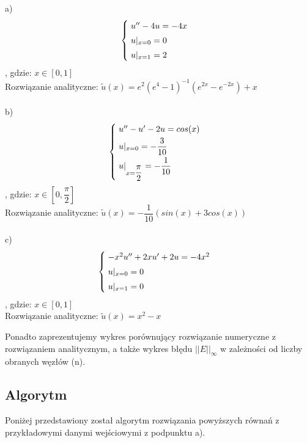 a)
\[
\begin{cases}
\vspace{0.1cm} 
\hspace{0,1cm} u'' - 4u =-4x \\
\vspace{0.1cm}
\hspace{0,1cm}u|_{x=0} = 0 \\
\hspace{0,1cm}u|_{x=1} = 2
\end{cases}
\]
, gdzie:
$x\in[0,1]$
\\
Rozwiązanie analityczne: $\widetilde{u}(x) = e^2(e^4-1)^{-1} (e^{2x} - e^{-2x}) + x$
\\
\\
b)
\[
\begin{cases}
\vspace{0.1cm} 
\hspace{0,1cm} u'' -u'- 2u =cos(x) \\
\vspace{0.1cm}
\hspace{0,1cm}u|_{x=0} = -\dfrac{3}{10} \\
\hspace{0,1cm}u|_{x=\dfrac{\pi}{2}} = -\dfrac{1}{10}
\end{cases}
\]
, gdzie:
$x\in[0, \dfrac{\pi}{2}]$
\\
Rozwiązanie analityczne: $\widetilde{u}(x) = -\dfrac{1}{10}(sin(x) + 3cos(x))$
\\
\\
c)
\[
\begin{cases}
\vspace{0.1cm} 
\hspace{0,1cm} -x^2u'' +2xu' +2u=-4x^2 \\
\vspace{0.1cm}
\hspace{0,1cm}u|_{x=0} = 0 \\
\hspace{0,1cm}u|_{x=1} = 0
\end{cases}
\]
, gdzie:
$x\in[0,1]$
\\
Rozwiązanie analityczne: $\widetilde{u}(x) = x^2 - x$

\vspace{0.3cm}
Ponadto zaprezentujemy wykres porównujący rozwiązanie numeryczne z rozwiązaniem analitycznym, a także wykres błędu $||E||_{\infty}$ w zależności od liczby obranych węzłów (n).
\newpage
\subsection{Algorytm}
Poniżej przedstawiony został algorytm rozwiązania powyższych równań z przykładowymi danymi wejściowymi z podpunktu a).



